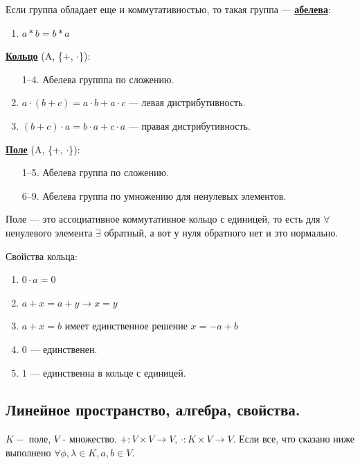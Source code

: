 \documentclass[twoside]{book}
\newcommand{\deff}[1]{\underline{\textbf{#1}}}
\begin{document}
Если группа обладает еще и коммутативностью, то такая группа --- \deff{абелева}:

\begin{enumerate}[resume]
    \item $a * b = b * a$
\end{enumerate}

\deff{Кольцо} (A, \{+, $\cdot$\}):

\begin{enumerate}
    \item[1--4.] Абелева групппа по сложению.
    \setcounter{enumi}{4}
    \item $a \cdot (b+c) = a\cdot b + a\cdot c$ --- левая дистрибутивность.
    \item $(b+c)\cdot a  = b \cdot a + c \cdot a$  --- правая дистрибутивность.
\end{enumerate}

\deff{Поле}  (A, \{+, $\cdot$\}):
\begin{enumerate}
    \item[1--5.] Абелева группа по сложению.
    \item[6--9.] Абелева группа по умножению для ненулевых элементов.
\end{enumerate}

Поле --- это ассоциативное коммутативное кольцо с единицей, то есть для $\forall$ ненулевого элемента $\exists$ обратный, а вот у нуля обратного нет и это нормально.

Свойства кольца:

\begin{enumerate}
    \item $0 \cdot a = 0$
    \item $a+x = a+ y \rightarrow x=y$
    \item $a + x = b$ имеет единственное решение $x = -a + b$
    \item $0$ --- единственен.
    \item $1$ --- единственна в кольце с единицей.
\end{enumerate}

\subsection{Линейное пространство, алгебра, свойства.}

$K - $ поле, $V$ - множество. $+: V \times V \rightarrow V$, $\cdot: K\times V \rightarrow V$. Если все, что сказано ниже выполнено  $\forall \phi, \lambda \in K, a,b \in V$.
\end{document}
